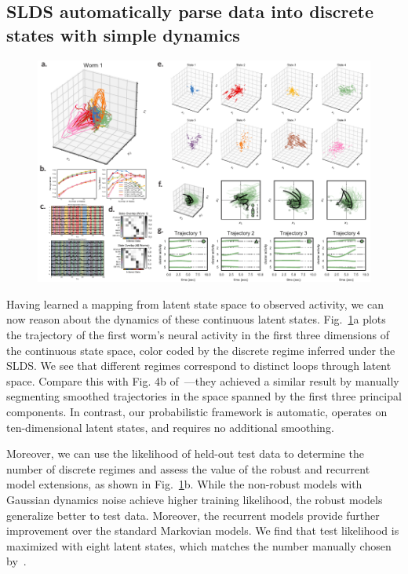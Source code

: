 \documentclass[11pt]{article}
\begin{document}
\subsection*{SLDS automatically parse data into discrete states with simple dynamics}

\begin{figure}[t]
\centering%
\includegraphics[width=6in]{figures/figure3} 
\caption{}
\label{fig:syllables}
\end{figure}

Having learned a mapping from latent state space to observed activity,
we can now reason about the dynamics of these continuous latent
states. Fig.~\ref{fig:syllables}a plots the trajectory of the first
worm's neural activity in the first three dimensions of the continuous
state space, color coded by the discrete regime inferred under the
SLDS.  We see that different regimes correspond to distinct loops
through latent space.  Compare this with Fig. 4b
of~\citet{kato2015global}---they achieved a similar result by manually
segmenting smoothed trajectories in the space spanned by the first
three principal components.  In contrast, our probabilistic framework
is automatic, operates on ten-dimensional latent states, and requires
no additional smoothing.

Moreover, we can use the likelihood of held-out test data to determine
the number of discrete regimes and assess the value of the robust and
recurrent model extensions, as shown in Fig.~\ref{fig:syllables}b.
While the non-robust models with Gaussian dynamics noise achieve
higher training likelihood, the robust models generalize better to
test data.  Moreover, the recurrent models provide further improvement
over the standard Markovian models.  We find that test likelihood is
maximized with eight latent states, which matches the number manually
chosen by~\citet{kato2015global}.
\end{document}
